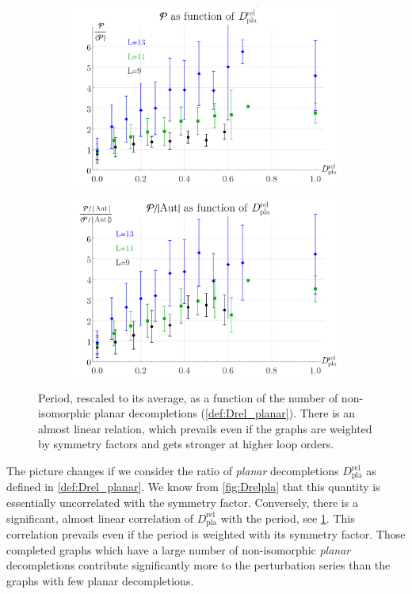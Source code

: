 \documentclass[12pt,a4paper]{article}
\renewcommand{\|}{\rule[-0.4ex]{0.2ex}{1.2em}}
\begin{document}
\begin{figure}[htbp]
	\begin{subfigure}[b]{.48 \textwidth}
		\includegraphics[width=\linewidth]{P_Drelpla}
		\subcaption{}
	\end{subfigure}
	\begin{subfigure}[b]{.48 \textwidth}
		\includegraphics[width=\linewidth]{PAut_Drelpla}
		\subcaption{}
	\end{subfigure}
	
	\caption{
		Period, rescaled to its average, as a function of the number of non-isomorphic planar decompletions (\cref{def:Drel_planar}). There is an almost linear relation, which prevails even if the graphs are weighted by symmetry factors and gets stronger at higher loop orders.}
	\label{fig:P_Drelpla}
\end{figure}



The picture changes if we consider the ratio of \emph{planar} decompletions  $D^\text{rel}_\text{pla}$ as defined in \cref{def:Drel_planar}. We know from \cref{fig:Drelpla} that this quantity is essentially uncorrelated with the symmetry factor. Conversely, there is a significant, almost linear correlation of $D^\text{rel}_\text{pla}$ with the period, see \cref{fig:P_Drelpla}. This correlation prevails even if the period is weighted with its symmetry factor. Those completed graphs which have a large number of non-isomorphic \emph{planar} decompletions   contribute significantly more to the perturbation series than the graphs with few planar decompletions. 
\end{document}
